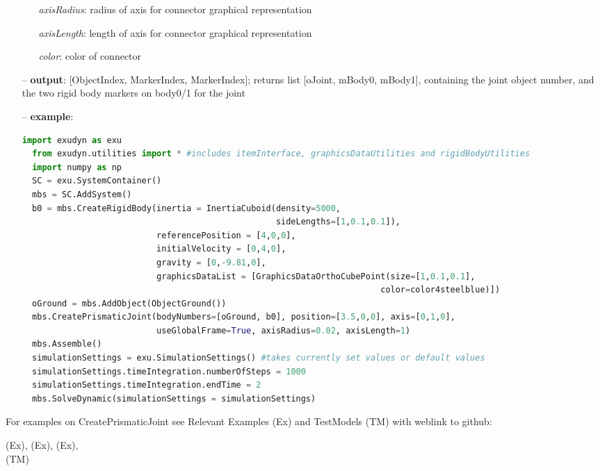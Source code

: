 \begin{itemize}[leftmargin=0.7cm]
\begin{itemize}[leftmargin=1.2cm]
\item[]{\it axisRadius}: radius of axis for connector graphical representation
\item[]{\it axisLength}: length of axis for connector graphical representation
\item[]{\it color}: color of connector
\end{itemize}
\item[--]
{\bf output}: [ObjectIndex, MarkerIndex, MarkerIndex]; returns list [oJoint, mBody0, mBody1], containing the joint object number, and the two rigid body markers on body0/1 for the joint
\item[--]
{\bf example}: \vspace{-12pt}\ei\begin{lstlisting}[language=Python, xleftmargin=36pt]
  import exudyn as exu
  from exudyn.utilities import * #includes itemInterface, graphicsDataUtilities and rigidBodyUtilities
  import numpy as np
  SC = exu.SystemContainer()
  mbs = SC.AddSystem()
  b0 = mbs.CreateRigidBody(inertia = InertiaCuboid(density=5000,
                                                   sideLengths=[1,0.1,0.1]),
                           referencePosition = [4,0,0],
                           initialVelocity = [0,4,0],
                           gravity = [0,-9.81,0],
                           graphicsDataList = [GraphicsDataOrthoCubePoint(size=[1,0.1,0.1],
                                                                        color=color4steelblue)])
  oGround = mbs.AddObject(ObjectGround())
  mbs.CreatePrismaticJoint(bodyNumbers=[oGround, b0], position=[3.5,0,0], axis=[0,1,0],
                           useGlobalFrame=True, axisRadius=0.02, axisLength=1)
  mbs.Assemble()
  simulationSettings = exu.SimulationSettings() #takes currently set values or default values
  simulationSettings.timeIntegration.numberOfSteps = 1000
  simulationSettings.timeIntegration.endTime = 2
  mbs.SolveDynamic(simulationSettings = simulationSettings)
\end{lstlisting}\vspace{-24pt}\bi\item[]\vspace{-24pt}\vspace{12pt}\end{itemize}
%

%
\noindent For examples on CreatePrismaticJoint see Relevant Examples (Ex) and TestModels (TM) with weblink to github:
\bi
 \item \footnotesize {} (Ex), 
 (Ex), 
 (Ex), 
\\  (TM)
\ei

